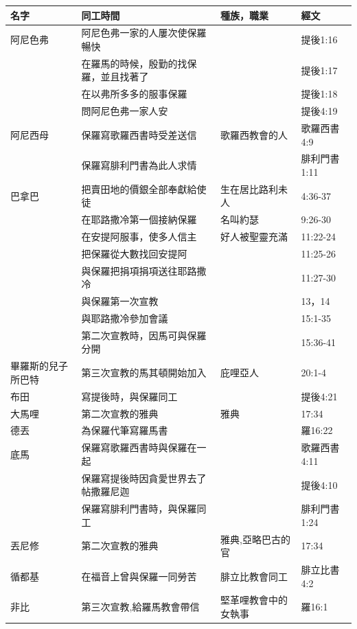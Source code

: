 \begin{table}[htbp]
  \centering
    \begin{tabular}{|l|l|l|l|}
    \toprule
   名字 & 同工時間  & 種族，職業 &   經文\\
    \midrule
       阿尼色弗&阿尼色弗一家的人屢次使保羅暢快 & &提後1:16\\ 
&在羅馬的時候，殷勤的找保羅，並且找著了 & &提後1:17\\ 
&在以弗所多多的服事保羅 & &提後1:18\\
&問阿尼色弗一家人安 & &提後4:19\\ \midrule      
    阿尼西母& 保羅寫歌羅西書時受差送信&歌羅西教會的人 &歌羅西書4:9  \\
  & 保羅寫腓利門書為此人求情&  &腓利門書1:11  \\   \midrule
    巴拿巴  &把賣田地的價銀全部奉獻給使徒 & 生在居比路利未人 & 4:36-37\\
    &在耶路撒冷第一個接納保羅 & 名叫約瑟 & 9:26-30\\
    &在安提阿服事，使多人信主 &好人被聖靈充滿  & 11:22-24\\   
     &把保羅從大數找回安提阿  &  & 11:25-26\\
      &與保羅把捐項捐項送往耶路撒冷 &   & 11:27-30\\    
      &與保羅第一次宣教 &   & 13，14\\
        &與耶路撒冷參加會議 &   & 15:1-35 \\
          &第二次宣教時，因馬可與保羅分開 &   & 15:36-41 \\   \midrule 
  畢羅斯的兒子所巴特 &第三次宣教的馬其頓開始加入&庇哩亞人  & 20:1-4  \\
    \midrule 
     布田&寫提後時，與保羅同工  &  & 提後4:21 \\ \midrule
     大馬哩&第二次宣教的雅典 &雅典  &17:34 \\   \midrule
     德丟 &為保羅代筆寫羅馬書 & &羅16:22\\ \midrule
     底馬& 保羅寫歌羅西書時與保羅在一起&  &歌羅西書4:11  \\     
   & 保羅寫提後時因貪愛世界去了帖撒羅尼迦&  &提後4:10  \\
  &保羅寫腓利門書時，與保羅同工 & &腓利門書1:24\\ 
 \midrule
     丟尼修&第二次宣教的雅典 &雅典,亞略巴古的官  &17:34 \\    \midrule
     循都基&在福音上曾與保羅一同勞苦 &腓立比教會同工 &腓立比書4:2\\ \midrule
  非比 &第三次宣教,給羅馬教會帶信&堅革哩教會中的女執事&羅16:1 \\

\end{tabular}
\end{table}
